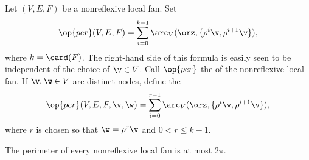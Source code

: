 
\begin{definition}[perimeter]\label{lemma:perim}
Let $(V,E,F)$ be a nonreflexive local fan.    Set
\[ 
  \op{per}(V,E,F) 
= \sum_{i=0}^{k-1} \arc_V(\orz,\{\rho^i \v,\rho^{i+1} \v\}), 
\] 
where $k=\card(F)$.  The right-hand side of this formula is easily
seen to be independent of the choice of $\v\in V$.  Call $\op{per}$
the  of the nonreflexive local fan.  If $\v,\w\in V$ are
distinct nodes, define the 
\[ 
  \op{per}(V,E,F,\v,\w) 
= \sum_{i=0}^{r-1} \arc_V(\orz,\{\rho^i \v,\rho^{i+1} \v\}), 
\] 
where $r$ is chosen so that $\w=\rho^r \v$ and $0<r\le k-1$.
\end{definition}
%
%
%



\begin{lemma} %
\label{lemma:convex-hyp}
The perimeter of every nonreflexive local fan is at most $2\pi$.  
\end{lemma}
%
%

